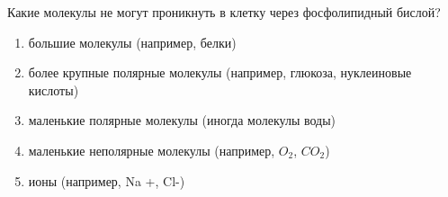 
Какие молекулы не
могут проникнуть в клетку через фосфолипидный бислой?

\begin{enumerate}
    \item большие молекулы (например, белки)
    \item более крупные полярные молекулы (например, глюкоза, нуклеиновые кислоты)
    \item маленькие полярные молекулы (иногда молекулы воды)
    \item маленькие неполярные молекулы (например, $O_2$, $CO_2$)
    \item ионы (например, Na +, Cl-)
\end{enumerate}




